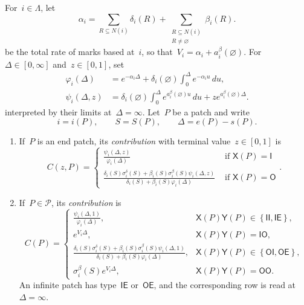 \documentclass[EJP,preprint,NODS,nobera]{ejpecp}
\newcommand{\R}{\mathbb{R}}
\newcommand{\cb}[1]{\left\{#1\right\}}
\newcommand{\pw}[4]{\left\{\begin{array}{cl}
  #1 &\text{ if } #2 \\
  #3 &\text{ if } #4
\end{array}\right.}
\newcommand{\rev}[1]{{\color{red}#1}}
\begin{document}
\begin{definition}
\label{def:patch-contributions}
For~$i\in\Lambda$, let
\begin{equation*}
\alpha_i
=
\sum_{R\subseteq N(i)}\delta_i(R)
+
\sum_{\substack{R\subseteq N(i)\\R\neq\varnothing}}\beta_i(R).
\end{equation*}
\rev{be the total rate of marks based at~$i$}, so
that~$V_i=\alpha_i+a_i^\beta(\varnothing)$. For~$\Delta\in[0,\infty]$
and~$z\in[0,1]$, set
\begin{align}
\varphi_i(\Delta)
&=
e^{-\alpha_i\Delta}
+
\delta_i(\varnothing)
\int_0^\Delta e^{-\alpha_i u}\,du,
\label{eq:patch-phi}
\\
\psi_i(\Delta,z)
&=
\delta_i(\varnothing)
\int_0^\Delta e^{a_i^\beta(\varnothing)u}\,du
+
z e^{a_i^\beta(\varnothing)\Delta}.
\label{eq:patch-psi}
\end{align}
interpreted by their limits at~$\Delta=\infty$. Let~$P$ be a patch and write
\begin{equation*}
i=i(P),
\qquad
S=S(P),
\qquad
\Delta=e(P)-s(P).
\end{equation*}
\begin{enumerate}[label=\textup{(\alph*)}]
\item If~$P$ is an end patch, its \emph{contribution} with terminal
value~$z\in[0,1]$ is
\begin{equation}
\label{eq:end-contribution-formulas}
C(z,P)
=
\pw{
\displaystyle
\frac{\psi_i(\Delta,z)}{\varphi_i(\Delta)}
}{\mathsf X(P)=\mathsf I}
{
\displaystyle
\frac{
\delta_i(S)\sigma_i^\delta(S)
+
\beta_i(S)\sigma_i^\beta(S)\psi_i(\Delta,z)
}{
\delta_i(S)+\beta_i(S)\varphi_i(\Delta)
}
}{\mathsf X(P)=\mathsf O}.
\end{equation}
\item If~$P\in\mathcal P$, its \emph{contribution} is
\begin{equation}
\label{eq:full-contribution-formulas}
C(P)
=
\begin{cases}
\displaystyle
\frac{\psi_i(\Delta,1)}{\varphi_i(\Delta)},
&\mathsf X(P)\mathsf Y(P)\in\cb{\mathsf{II},\mathsf{IE}},
\\[1.4em]
e^{V_i\Delta},
&\mathsf X(P)\mathsf Y(P)=\mathsf{IO},
\\[0.8em]
\displaystyle
\frac{
\delta_i(S)\sigma_i^\delta(S)
+
\beta_i(S)\sigma_i^\beta(S)\psi_i(\Delta,1)
}{
\delta_i(S)+\beta_i(S)\varphi_i(\Delta)
},
&\mathsf X(P)\mathsf Y(P)\in\cb{\mathsf{OI},\mathsf{OE}},
\\[1.4em]
\sigma_i^\beta(S)e^{V_i\Delta},
&\mathsf X(P)\mathsf Y(P)=\mathsf{OO}.
\end{cases}
\end{equation}
An infinite patch has type~$\mathsf{IE}$ or~$\mathsf{OE}$, and the
corresponding row is read at~$\Delta=\infty$.
\end{enumerate}
\end{definition}
\end{document}
